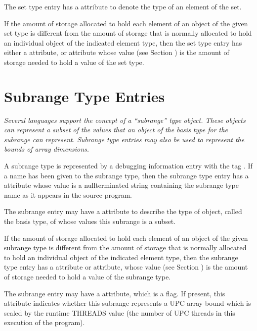 The set type entry has a  attribute to denote the
type of an element of the set.

If the amount of storage allocated to hold each element of an
object of the given set type is different from the amount of
storage that is normally allocated to hold an individual object
of the indicated element type, then the set type entry has
either a  attribute, or  attribute
whose value (see Section ) is
the amount of storage needed to hold a value of the set type.


\section{Subrange Type Entries}
\label{chap:subrangetypeentries}

\textit{Several languages support the concept of a ``subrange''
type object. These objects can represent a subset of the
values that an object of the basis type for the subrange can
represent. Subrange type entries may also be used to represent
the bounds of array dimensions.}

A subrange type is represented by a debugging information
entry with the 
tag . 
If a name has been
given to the subrange type, then the subrange type entry
has a  attribute whose value is a null\dash terminated
string containing the subrange type name as it appears in
the source program.

The subrange entry may have a  attribute to describe
the type of object, called the basis type, of whose values
this subrange is a subset.

If the amount of storage allocated to hold each element of an
object of the given subrange type is different from the amount
of storage that is normally allocated to hold an individual
object of the indicated element type, then the subrange
type entry has a  attribute or 
attribute, whose value 
(see Section )
is the amount of
storage needed to hold a value of the subrange type.

The subrange entry may have a  attribute,
which is a flag. If present, this attribute indicates whether
this subrange represents a UPC array bound which is scaled
by the runtime THREADS value (the number of UPC threads in
this execution of the program).

